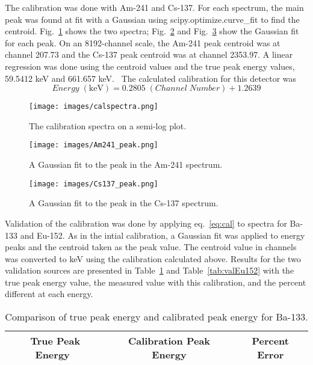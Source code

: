 The calibration was done with Am-241 and Cs-137. For each spectrum, the main peak was found at fit with a Gaussian using scipy.optimize.curve\_fit to find the centroid. Fig.~\ref{fig:calspectra} shows the two spectra; Fig.~\ref{fig:Am241peak} and Fig.~\ref{fig:Cs137peak} show the Gaussian fit for each peak. On an 8192-channel scale, the Am-241 peak centroid was at channel 207.73 and the Cs-137 peak centroid was at channel 2353.97. A linear regression was done using the centroid values and the true peak energy values, 59.5412 keV and 661.657 keV.~\cite{lblndata} The calculated calibration for this detector was
\begin{equation}
  \label{eq:cal} 
  Energy \; \mathrm{ (keV)} = 0.2805 \; (Channel \; Number) + 1.2639 
\end{equation}

\begin{figure}[H]
  \centering
  \texttt{[image: images/calspectra.png]} 
  \caption{The calibration spectra on a semi-log plot.} 
  \label{fig:calspectra} 
\end{figure}
 
\begin{figure}[H]
  \centering
  \texttt{[image: images/Am241\_peak.png]} 
  \caption{A Gaussian fit to the peak in the Am-241 spectrum.} 
  \label{fig:Am241peak} 
\end{figure}

\begin{figure}[H]
  \centering
  \texttt{[image: images/Cs137\_peak.png]} 
  \caption{A Gaussian fit to the peak in the Cs-137 spectrum.} 
  \label{fig:Cs137peak} 
\end{figure}

Validation of the calibration was done by applying eq.~\ref{eq:cal} to spectra for Ba-133 and Eu-152. As in the intial calibration, a Gaussian fit was applied to energy peaks and the centroid taken as the peak value. The centroid value in channels was converted to keV using the calibration calculated above. Results for the two validation sources are presented in Table~\ref{tab:valBa133} and Table~\ref{tab:valEu152} with the true peak energy value, the measured value with this calibration, and the percent different at each energy.

\begin{table}[H]
  \centering 
  \caption{Comparison of true peak energy and calibrated peak energy for Ba-133.} 
  \begin{tabular}{|ccc|} 
    \hline 
    True Peak Energy~\cite{lblndata} & Calibration Peak Energy & Percent Error \\ 
    \hline 
    
    \hline  
  \end{tabular} 
  \label{tab:valBa133}
\end{table} 

